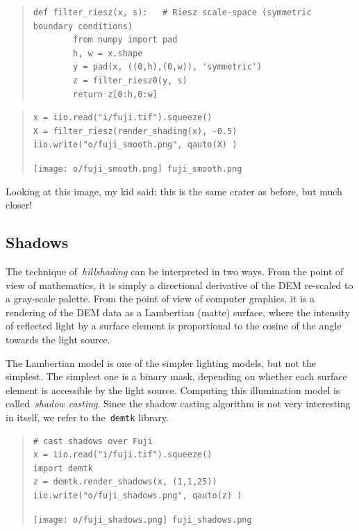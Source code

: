 \begin{quote}
\begin{verbatim}
def filter_riesz(x, s):   # Riesz scale-space (symmetric boundary conditions)
        from numpy import pad
        h, w = x.shape
        y = pad(x, ((0,h),(0,w)), 'symmetric')
        z = filter_riesz0(y, s)
        return z[0:h,0:w]
\end{verbatim}
\end{quote}

\begin{quote}
\begin{verbatim}
x = iio.read("i/fuji.tif").squeeze()
X = filter_riesz(render_shading(x), -0.5)
iio.write("o/fuji_smooth.png", qauto(X) )
\end{verbatim}
\texttt{[image: o/fuji\_smooth.png]}~\verb+fuji_smooth.png+
\end{quote}

Looking at this image, my kid said: this is the same crater as before, but
much closer!



\clearpage
\subsection{Shadows}

The technique of~\emph{hillshading} can be interpreted in two ways.
From the point of view of mathematics, it is simply a directional derivative
of the DEM re-scaled to a gray-scale palette.
From the point of view of computer graphics, it is a rendering of the DEM
data as a Lambertian (matte) surface, where the intensity of reflected light
by a surface element is proportional to the cosine of the angle towards the
light source.

The Lambertian model is one of the simpler lighting models, but not the
simplest.  The simplest one is a binary mask, depending on whether each
surface element is accessible by the light source.  Computing this
illumination model is called~\emph{shadow casting}.  Since the shadow casting
algorithm is not very interesting in itself, we refer to the~\verb+demtk+
library.

\begin{quote}
\begin{verbatim}
# cast shadows over Fuji
x = iio.read("i/fuji.tif").squeeze()
import demtk
z = demtk.render_shadows(x, (1,1,25))
iio.write("o/fuji_shadows.png", qauto(z) )
\end{verbatim}
\texttt{[image: o/fuji\_shadows.png]}~\verb+fuji_shadows.png+
\end{quote}

